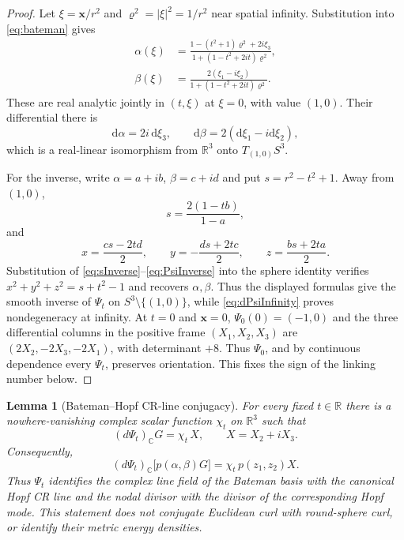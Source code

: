 \documentclass[aps,prd,reprint,nofootinbib,superscriptaddress]{revtex4-2}
\newtheorem{lemma}[theorem]{Lemma}
\theoremstyle{definition}
\theoremstyle{remark}
\newcommand{\R}{\mathbb{R}}
\newcommand{\dd}{\mathrm{d}}
\begin{document}
\begin{proof}
Let $\xi=\mathbf x/r^2$ and $\varrho^2=|\xi|^2=1/r^2$ near spatial infinity. Substitution into \eqref{eq:bateman} gives
\begin{align}
\alpha(\xi)
&=\frac{1-(t^2+1)\varrho^2+2i\xi_3}
{1+(1-t^2+2it)\varrho^2},\\
\beta(\xi)
&=\frac{2(\xi_1-i\xi_2)}
{1+(1-t^2+2it)\varrho^2}.
\label{eq:inversion}
\end{align}
These are real analytic jointly in $(t,\xi)$ at $\xi=0$, with value $(1,0)$. Their differential there is
\begin{equation}
\dd\alpha=2i\,\dd\xi_3,
\qquad
\dd\beta=2(\dd\xi_1-i\dd\xi_2),
\label{eq:dPsiInfinity}
\end{equation}
which is a real-linear isomorphism from $\R^3$ onto $T_{(1,0)}S^3$.

For the inverse, write $\alpha=a+ib$, $\beta=c+id$ and put $s=r^2-t^2+1$. Away from $(1,0)$,
\begin{equation}
s=\frac{2(1-tb)}{1-a},
\label{eq:sInverse}
\end{equation}
and
\begin{equation}
x=\frac{cs-2td}{2},
\qquad
y=-\frac{ds+2tc}{2},
\qquad
z=\frac{bs+2ta}{2}.
\label{eq:PsiInverse}
\end{equation}
Substitution of \eqref{eq:sInverse}--\eqref{eq:PsiInverse} into the sphere identity verifies $x^2+y^2+z^2=s+t^2-1$ and recovers $\alpha,\beta$. Thus the displayed formulas give the smooth inverse of $\Psi_t$ on $S^3\setminus\{(1,0)\}$, while \eqref{eq:dPsiInfinity} proves nondegeneracy at infinity. At $t=0$ and $\mathbf x=0$, $\Psi_0(0)=(-1,0)$ and the three differential columns in the positive frame $(X_1,X_2,X_3)$ are $(2X_2,-2X_3,-2X_1)$, with determinant $+8$. Thus $\Psi_0$, and by continuous dependence every $\Psi_t$, preserves orientation. This fixes the sign of the linking number below.
\end{proof}

\begin{lemma}[Bateman--Hopf CR-line conjugacy]
\label{lem:BatemanHopfConjugacy}
For every fixed $t\in\mathbb R$ there is a nowhere-vanishing complex scalar function $\chi_t$ on $\mathbb R^3$ such that
\begin{equation}
(d\Psi_t)_{\mathbb C}G=\chi_t\,X,
\qquad X=X_2+iX_3.
\label{eq:BatemanHopfConjugacy}
\end{equation}
Consequently,
\begin{equation}
(d\Psi_t)_{\mathbb C}\bigl[p(\alpha,\beta)G\bigr]
=\chi_t\,p(z_1,z_2)X.
\label{eq:BatemanHopfConjugacyP}
\end{equation}
Thus $\Psi_t$ identifies the complex line field of the Bateman basis with the canonical Hopf CR line and the nodal divisor with the divisor of the corresponding Hopf mode. This statement does not conjugate Euclidean curl with round-sphere curl, or identify their metric energy densities.
\end{lemma}
\end{document}
